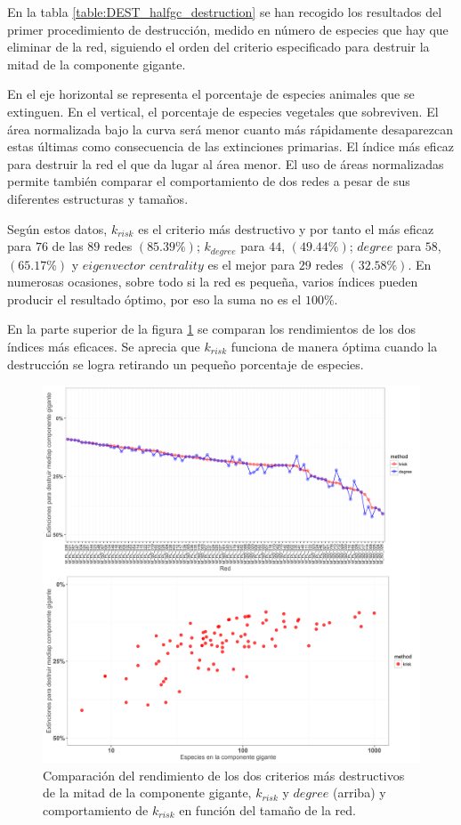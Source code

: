En la tabla \ref{table:DEST_halfgc_destruction} se han recogido los resultados del primer procedimiento de destrucción, medido en número de especies que hay que eliminar de la red, siguiendo el orden del criterio especificado para destruir la mitad de la componente gigante.

En el eje horizontal se representa el porcentaje de especies animales que se extinguen. En el vertical, el porcentaje de especies vegetales que sobreviven. El área normalizada bajo la curva será menor cuanto más rápidamente desaparezcan estas últimas como consecuencia de las extinciones primarias. El índice más eficaz para destruir la red el que da lugar al área menor. El uso de áreas normalizadas permite también comparar el comportamiento de dos redes a pesar de sus diferentes estructuras y tamaños.

Según estos datos, $k_{risk}$ es el criterio más destructivo y por tanto el más eficaz para $76$ de las $89$ redes $(85.39\%)$; $k_{degree}$ para $44$, $(49.44\%)$; $degree$ para $58$, $(65.17\%)$ y
$eigenvector$ $centrality$ es el mejor para $29$ redes $(32.58\%)$. En numerosas ocasiones, sobre todo si la red es pequeña, varios índices pueden producir el
resultado óptimo, por eso la suma no es el $100\%$.

En la parte superior de la figura \ref{fig:DEST_krisk_kdegree_comparison_ES} se comparan los rendimientos de los dos índices más eficaces. Se aprecia que ${k}_{risk}$ funciona de manera óptima cuando la destrucción se logra retirando un pequeño porcentaje de especies.

\clearpage
\begin{figure}[h!]
\centering
\includegraphics[scale=0.55]{Figures/DEST_krisk_kdegree_comparison_ES.png}
\caption {Comparación del rendimiento de los dos criterios más destructivos de la mitad de la componente gigante, $k_{risk}$ y $degree$ (arriba) y comportamiento de ${k}_{risk}$ en función del tamaño de la red.}
\label{fig:DEST_krisk_kdegree_comparison_ES}
\end{figure}

